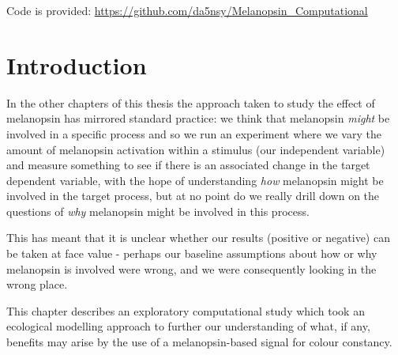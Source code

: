 
Code is provided: \url{https://github.com/da5nsy/Melanopsin_Computational}

\section{Introduction}

In the other chapters of this thesis the approach taken to study the effect of melanopsin has mirrored standard practice: we think that melanopsin \emph{might} be involved in a specific process and so we run an experiment where we vary the amount of melanopsin activation within a stimulus (our independent variable) and measure something to see if there is an associated change in the target dependent variable, with the hope of understanding \emph{how} melanopsin might be involved in the target process, but at no point do we really drill down on the questions of \emph{why} melanopsin might be involved in this process.

This has meant that it is unclear whether our results (positive or negative) can be taken at face value - perhaps our baseline assumptions about how or why melanopsin is involved were wrong, and we were consequently looking in the wrong place.

This chapter describes an exploratory computational study which took an ecological modelling approach to further our understanding of what, if any, benefits may arise by the use of a melanopsin-based signal for colour constancy.

